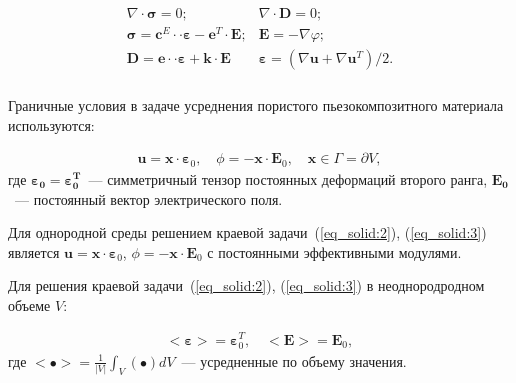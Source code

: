 \begin{equation} \label{eq_solid:2}  
	\begin{aligned}
	\begin{array}{ll} 
		\nabla \cdot \boldsymbol{\sigma} =0; & \nabla \cdot \boldsymbol{D}={0};\\ 
		\boldsymbol{\sigma} =\boldsymbol{c}^{E} \cdot \cdot \boldsymbol{\varepsilon}-\boldsymbol{e}^{T} \cdot \boldsymbol{E}; & \boldsymbol{E}=-\nabla \varphi;\\
		\boldsymbol{D} =\boldsymbol{e} \cdot \cdot  \boldsymbol{\varepsilon}+\boldsymbol{k} \cdot \boldsymbol{E} & \boldsymbol{\varepsilon} =(\nabla \boldsymbol{u}+\nabla \boldsymbol{u}^{T} )/2.\\
	\end{array} 
\end{aligned} 
\end{equation}

Граничные условия в задаче усреднения  пористого пьезокомпозитного материала~\cite{Mawassy2021} используются:  

\begin{equation}\label{eq_solid:3} 
	\begin{aligned}
	\boldsymbol{u}=\boldsymbol{x} \cdot \boldsymbol{\varepsilon}_0, \quad \phi=-\boldsymbol{x} \cdot \boldsymbol{E}_0, \quad \boldsymbol{x} \in \Gamma=\partial V,
\end{aligned} 
\end{equation}
где $\boldsymbol{\varepsilon_0}=\boldsymbol{\varepsilon_0^T}$~--- симметричный тензор постоянных деформаций второго ранга, $\boldsymbol{E_0}$~--- постоянный вектор электрического поля.

Для однородной среды решением краевой задачи~(\ref{eq_solid:2}), (\ref{eq_solid:3}) является $\boldsymbol{u}=\boldsymbol{x} \cdot \boldsymbol{\varepsilon}_0$, $\phi=-\boldsymbol{x} \cdot \boldsymbol{E}_0$ с постоянными эффективными модулями.

Для решения краевой задачи~(\ref{eq_solid:2}), (\ref{eq_solid:3}) в неоднородродном объеме $V$:

\begin{equation}\label{eq2:1} 
	\begin{aligned}
	<\boldsymbol{\varepsilon}>=\boldsymbol{\varepsilon}_0^T, \quad <\boldsymbol{E}>=\boldsymbol{E}_0,
\end{aligned} 
\end{equation}
где $<\bullet>=\frac1{|V|}\int_V(\bullet)dV$~--- усредненные по объему значения.

